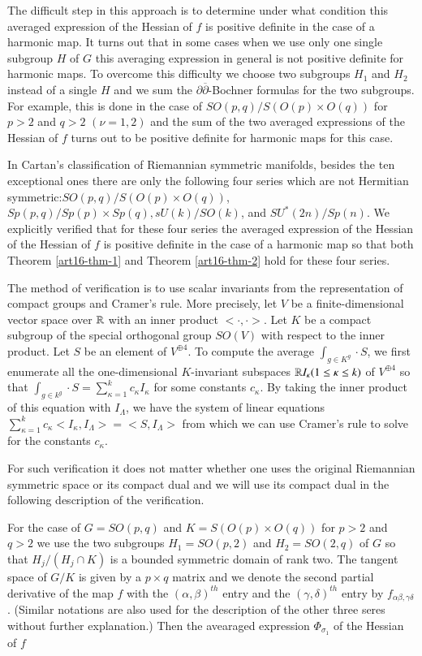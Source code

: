 The difficult step in this approach is to determine under what condition this averaged expression of the Hessian of $f$ is positive definite in the case of a harmonic map. It turns out that in some cases when we use only one single subgroup $H$ of $G$ this averaging expression in general is not positive definite for harmonic maps. To overcome this difficulty we choose two subgroups $H_{1}$ and $H_{2}$ instead of a single $H$ and we sum the $\partial\overline{\partial}$-Bochner formulas for the two subgroups. For example, this is done in the case of $SO(p,q)/S(O(p) \times O(q))$ for $p > 2$ and $q>2$ $(\nu =1, 2)$ and the sum of the two averaged expressions of the Hessian of $f$ turns out to be positive definite for harmonic maps for this case.

In Cartan's classification of Riemannian symmetric manifolds, besides the ten exceptional ones there are only the following four series which are not Hermitian symmetric:$ SO(p,q)/S(O(p)\times O(q))$,\break $Sp(p,q)/Sp(p)\times Sp(q), sU(k)/SO(k)$, and $SU^{*}(2n)/Sp(n)$. We explicitly verified that for these four series the averaged expression of the Hessian of the Hessian of $f$ is positive definite in the case of a harmonic map so that both Theorem \ref{art16-thm-1} and Theorem \ref{art16-thm-2} hold for these four series.  

The method of verification is to use scalar invariants from the representation of compact groups and Cramer's rule. More precisely, let $V$ be a finite-dimensional vector space over $\mathbb{R}$ with an inner product $<\cdot, \cdot>$. Let $K$ be a compact subgroup of the special orthogonal group $SO(V)$ with respect to the inner product. Let $S$ be an element of $V^{\oplus 4}$. To compute the average $\int_{g \in K^{g}} \cdot S$, we first enumerate all the one-dimensional $K$-invariant subspaces $\mathbb{R} I_{\kappa} (1 \leq \kappa \leq k)$ of $V^{\oplus 4}$ so that $\int_{g \in k^{g}}\cdot S= \sum_{\kappa=1}^{k} c_{\kappa}I_{\kappa}$ for some constants $c_{\kappa}$. By taking the inner product of this equation with $I_{\Lambda}$, we have the system of linear equations $\sum_{\kappa=1}^{k} c_{\kappa}< I_{\kappa},I_{\Lambda}> =<S, I_{\Lambda}>$ from which we can use Cramer's rule to solve for the constants $c_{\kappa}$. 

For such verification it does not matter whether one uses the original Riemannian symmetric space or its compact dual and we will use its compact dual in the following description of the verification.

For the case of $G=SO(p,q)$ and $K=S(O(p)\times O(q))$ for $p > 2$ and $q > 2$ we use the two subgroups $H_{1}=SO(p,2)$ and $H_{2}=SO(2,q)$ of $G$ so that $H_{j}/(H_{j}\cap K)$ is a bounded symmetric domain of rank two. The tangent space of $G/K$ is given by a $p \times q$ matrix and we denote the second partial derivative of the map $f$ with the $(\alpha, \beta)^{th}$ entry and the $(\gamma, \delta)^{th}$ entry by $f_{\alpha \beta, \gamma \delta}$. (Similar notations are also used for the description of the other three seres without further explanation.) Then the avearaged expression $\Phi_{\sigma_{1}}$ of the Hessian of $f$
